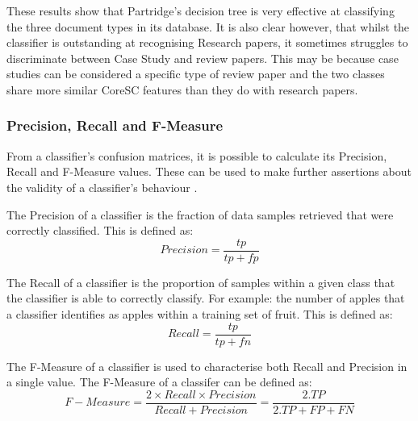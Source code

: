 These results show that Partridge's decision tree is very effective at
classifying the three document types in its database. It is also clear however,
that whilst the classifier is outstanding at recognising Research papers, it
sometimes struggles to discriminate between Case Study and review papers. This
may be because case studies can be considered a specific type of review paper
and the two classes share more similar CoreSC features than they do with
research papers.  

\subsubsection{ Precision, Recall and F-Measure }

From a classifier's confusion matrices, it is possible to calculate its
Precision, Recall and F-Measure values. These can be used to make further
assertions about the validity of a classifier's behaviour
\cite{witten2005data}.

The Precision of a classifier is the fraction of data samples retrieved that
were correctly classified. This is defined as:
\[Precision = \frac{tp}{tp+fp} \]

The Recall of a classifier is the proportion of samples within a given class
that the classifier is able to correctly classify. For example: the number of
apples that a classifier identifies as apples within a training set of fruit.
This is defined as:
\[Recall = \frac{tp}{tp+fn} \]

The F-Measure of a classifier is used to characterise both Recall and Precision
in a single value. The F-Measure of a classifer can be defined as:
\[
F-Measure = \frac{ 2 \times Recall \times Precision} { Recall + Precision } = 
\frac{2 . TP}{ 2 . TP + FP + FN }
\]


